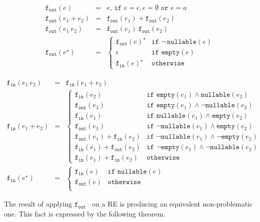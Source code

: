 \documentclass[review]{elsarticle}
\newcommand{\nullable}{\ensuremath{\texttt{nullable}}}
\newcommand{\emptyy}{\ensuremath{\texttt{empty}}}
\newcommand{\fin}{\ensuremath{\texttt{f$_{\texttt{in}}$}}}
\newcommand{\fout}{\ensuremath{\texttt{f$_{\texttt{out}}$}}}
\theoremstyle{definition}
\begin{document}
\[
\begin{array}{lcl}
   \fout(e) & = & e,\,\texttt{if } e = \epsilon, e = \emptyset \texttt{ or } e = a\\
   \fout(e_1 + e_2) & = & \fout(e_1) + \fout(e_2) \\
   \fout(e_1\:e_2) & = & \fout(e_1)\:\fout(e_2)\\
   \fout(e^\star) & = & \left\{
        \begin{array}{ll}
           \fout(e)^\star & \texttt{if } \neg\,\nullable(e)\\
           \epsilon       & \texttt{if } \emptyy(e)\\
           \fin(e)^\star  & \texttt{otherwise}
        \end{array}
                          \right.
\end{array}
\]

\[
\begin{array}{lcl}
   \fin(e_1\:e_2) & = & \fin(e_1+e_2)\\
   \fin(e_1 + e_2) & = & \left\{
             \begin{array}{ll}
                \fin(e_2)  & \texttt{if }\emptyy(e_1) \land \nullable(e_2)\\
                \fout(e_2) & \texttt{if }\emptyy(e_1) \land \neg \nullable(e_2)\\
                \fin(e_1)  & \texttt{if }\nullable(e_1) \land \emptyy(e_2)\\
                \fout(e_1) & \texttt{if }\neg \nullable(e_1) \land \emptyy(e_2)\\
                \fout(e_1) + \fin(e_2) & \texttt{if }\neg \nullable(e_1) \land \neg\emptyy(e_2)\\
                \fin(e_1) + \fout(e_2) & \texttt{if }\neg \emptyy(e_1) \land \neg \nullable(e_2)\\
                \fin(e_1) + \fin(e_2) & \texttt{otherwise}
             \end{array}
                         \right. \\
   \fin(e^\star) & = & \left\{
             \begin{array}{ll}
               \fin(e) & \texttt{if }\nullable(e)\\
               \fout(e) & \texttt{otherwise}\\
             \end{array}
                       \right.
\end{array}
\]

The result of applying \fout~ on a RE is producing an equivalent non-problematic one. This fact is expressed
by the following theorem. 
\end{document}
